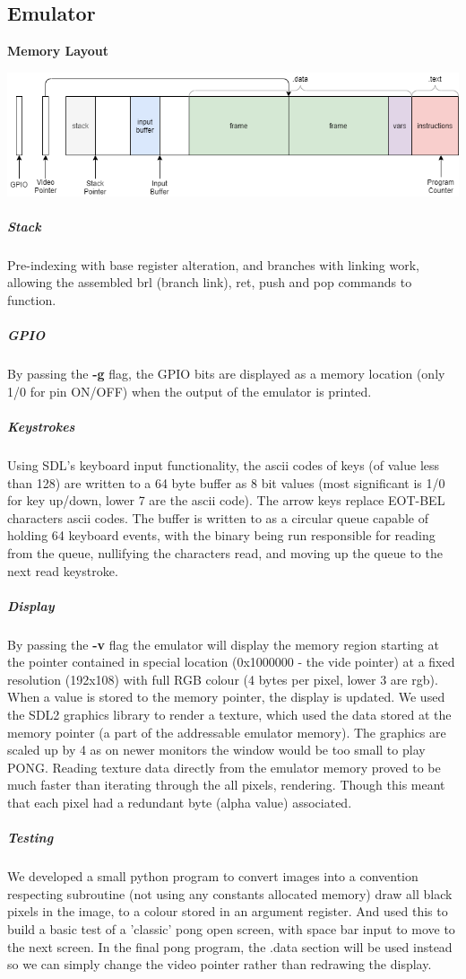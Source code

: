 \documentclass[11pt]{article}
\begin{document}
\subsection*{Emulator}
\centerline{\textbf{Memory Layout}}
\includegraphics[width=\textwidth]{emulator memory}
\subparagraph*{Stack}
Pre-indexing with base register alteration, and branches with linking work, allowing the assembled brl (branch link), ret, push and pop commands to function.
\subparagraph*{GPIO}
By passing the \textbf{-g} flag, the GPIO bits are displayed as a memory location (only 1/0 for pin ON/OFF) when the output of the emulator is printed.\\
\subparagraph*{Keystrokes}
Using SDL's keyboard input functionality, the ascii codes of keys (of value less than 128) are written to a 64 byte buffer as 8 bit values (most significant is 1/0 for key up/down, lower 7 are the ascii code). The arrow keys replace EOT-BEL characters ascii codes. The buffer is written to as a circular queue capable of holding 64 keyboard events, with the
\newline binary being run responsible for reading from the queue, nullifying the characters read, and moving up the queue to the next read keystroke.
\subparagraph*{Display}
By passing the \textbf{-v} flag the emulator will display the memory region starting at the pointer contained in special location (0x1000000 - the vide pointer) at a fixed resolution (192x108) with full RGB colour (4 bytes per pixel, lower 3 are rgb). When a value is stored to the memory pointer, the display is updated.
\newline\newline We used the SDL2 graphics library to render a texture, which used the data stored at the memory pointer (a part of the addressable emulator memory). The graphics are scaled up by 4 as on newer monitors the window would be too small to play PONG.
\newline\newline Reading texture data directly from the emulator memory proved to be much faster than iterating through the all pixels, rendering. Though this meant that each pixel had a redundant byte (alpha value) associated.
\subparagraph*{Testing}
We developed a small python program to convert images into a convention respecting subroutine (not using any constants allocated memory) draw all black pixels in the image, to a colour stored in an argument register. And used this to build a basic test of a 'classic' pong open screen, with space bar input to move to the next screen.
In the final pong program, the .data section will be used instead so we can simply change the video pointer rather than redrawing the display.
\end{document}
